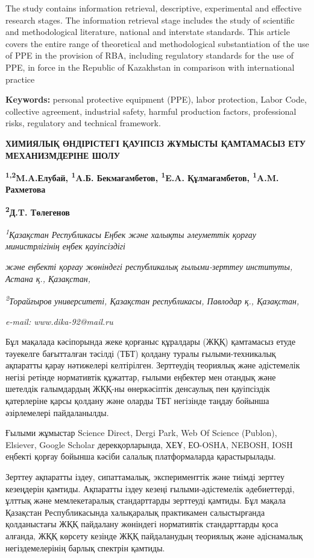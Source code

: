 {The study contains information retrieval, descriptive, experimental and
effective research stages. The information retrieval stage includes the
study of scientific and methodological literature, national and
interstate standards. This article covers the entire range of
theoretical and methodological substantiation of the use of PPE in the
provision of RBA, including regulatory standards for the use of PPE, in
force in the Republic of Kazakhstan in comparison with international
practice

{\bfseries Keywords:} personal protective equipment (PPE), labor
protection, Labor Code, collective agreement, industrial safety, harmful
production factors, professional risks, regulatory and technical
framework.

{\bfseries ХИМИЯЛЫҚ ӨНДІРІСТЕГІ ҚАУІПСІЗ ЖҰМЫСТЫ ҚАМТАМАСЫЗ ЕТУ
МЕХАНИЗМДЕРІНЕ ШОЛУ}

{\bfseries \textsuperscript{1,2}M.A.Елубай, \textsuperscript{1}A.Б.
Бекмағамбетов, \textsuperscript{1}E.A. Құлмағамбетов,
\textsuperscript{1}A.M. Рахметова}

{\bfseries \textsuperscript{2}Д.T. Төлегенов\textsuperscript{\envelope }}

\emph{\textsuperscript{1}Қазақстан Республикасы Еңбек және халықты
әлеуметтік қорғау министрлігінің еңбек қауіпсіздігі}

\emph{және еңбекті қорғау жөніндегі республикалық ғылыми-зерттеу
институты, Астана қ., Қазақстан,}

\emph{\textsuperscript{2}Торайғыров университеті, Қазақстан
республикасы, Павлодар қ., Қазақстан,}

\emph{e-mail: www.dika-92@mail.ru}

Бұл мақалада кәсіпорында жеке қорғаныс құралдары (ЖҚҚ) қамтамасыз етуде
тәуекелге бағытталған тәсілді (ТБТ) қолдану туралы ғылыми-техникалық
ақпаратты қарау нәтижелері келтірілген. Зерттеудің теориялық және
әдістемелік негізі ретінде нормативтік құжаттар, ғылыми еңбектер мен
отандық және шетелдік ғалымдардың ЖҚҚ-ны өнеркәсіптік денсаулық пен
қауіпсіздік қатерлеріне қарсы қолдану және оларды ТБТ негізінде таңдау
бойынша әзірлемелері пайдаланылды.

Ғылыми жұмыстар Science Direct, Dergi Park, Web Of Science (Publon),
Elsiever, Google Scholar дерекқорларында, ХЕҰ, ЕО-OSHA, NEBOSH, IOSH
еңбекті қорғау бойынша кәсіби салалық платформаларда қарастырылады.

Зерттеу ақпаратты іздеу, сипаттамалық, эксперименттік және тиімді
зерттеу кезеңдерін қамтиды. Ақпаратты іздеу кезеңі ғылыми-әдістемелік
әдебиеттерді, ұлттық және мемлекетаралық стандарттарды зерттеуді
қамтиды. Бұл мақала Қазақстан Республикасында халықаралық практикамен
салыстырғанда қолданыстағы ЖҚҚ пайдалану жөніндегі нормативтік
стандарттарды қоса алғанда, ЖҚҚ көрсету кезінде ЖҚҚ пайдаланудың
теориялық және әдіснамалық негіздемелерінің барлық спектрін қамтиды.

}
